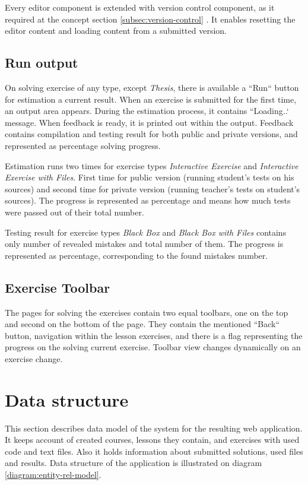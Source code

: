         Every editor component is extended with version control component, as it required at the concept section \ref{subsec:version-control} . It enables resetting the editor content and loading content from a submitted version.
        
        \subsection{Run output}
        On solving exercise of any type, except \textit{Thesis}, there is available a ``Run`` button for estimation a current result. When an exercise is submitted for the first time, an output area appears. During the estimation process, it contains ``Loading..` message. When feedback is ready, it is printed out within the output. Feedback contains compilation and testing result for both public and private versions, and represented as percentage solving progress.
        
        Estimation runs two times for exercise types \textit{Interactive Exercise} and \textit{Interactive Exercise with Files}. First time for public version (running student's tests on his sources) and second time for private version (running teacher's tests on student's sources). The progress is represented as percentage and means how much tests were passed out of their total number.
        
        Testing result for exercise types \textit{Black Box} and \textit{Black Box with Files} contains only number of revealed mistakes and total number of them. The progress is represented as percentage, corresponding to the found mistakes number.
        
        \subsection{Exercise Toolbar}
        The pages for solving the exercises contain two equal toolbars, one on the top and second on the bottom of the page. They contain the mentioned ``Back`` button, navigation within the lesson exercises, and there is a flag representing the progress on the solving current exercise. Toolbar view changes dynamically on an exercise change.
    
    
    \section{Data structure}
    This section describes data model of the system for the resulting web application. It keeps account of created courses, lessons they contain, and exercises with used code and text files. Also it holds information about submitted solutions, used files and results. Data structure of the application is illustrated on diagram \ref{diagram:entity-rel-model}.


